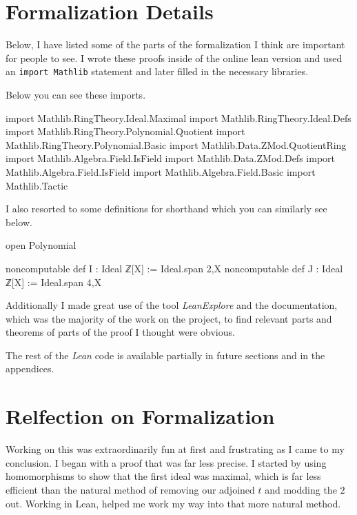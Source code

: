 \documentclass{article}
\begin{document}
\section{Formalization Details}

Below, I have listed some of the parts of the formalization I think are important for people to see. I wrote these proofs inside of the online lean version and used an \verb|import Mathlib| statement and later filled in the necessary libraries. 

\medskip
\noindent
Below you can see these imports.

\begin{lean}[show=code]
import Mathlib.RingTheory.Ideal.Maximal
import Mathlib.RingTheory.Ideal.Defs
import Mathlib.RingTheory.Polynomial.Quotient
import Mathlib.RingTheory.Polynomial.Basic
import Mathlib.Data.ZMod.QuotientRing
import Mathlib.Algebra.Field.IsField
import Mathlib.Data.ZMod.Defs
import Mathlib.Algebra.Field.IsField
import Mathlib.Algebra.Field.Basic
import Mathlib.Tactic
\end{lean}

\medskip
\noindent
I also resorted to some definitions for shorthand which you can similarly see below.

\begin{lean}[show=code]
open Polynomial

noncomputable def I : Ideal ℤ[X] := Ideal.span {2,X}
noncomputable def J : Ideal ℤ[X] := Ideal.span {4,X}
\end{lean}

\medskip
\noindent
Additionally I made great use of the tool \emph{LeanExplore} and the documentation, which was the majority of the work on the project, to find relevant parts and theorems of parts of the proof I thought were obvious. 

\medskip
\noindent
The rest of the \emph{Lean} code is available partially in future sections and in the appendices. 


\section{Relfection on Formalization}

Working on this was extraordinarily fun at first and frustrating as I came to my conclusion. I began with a proof that was far less precise. I started by using homomorphisms to show that the first ideal was maximal, which is far less efficient than the natural method of removing our adjoined $t$ and modding the $2$ out. Working in Lean, helped me work my way into that more natural method.
\end{document}
